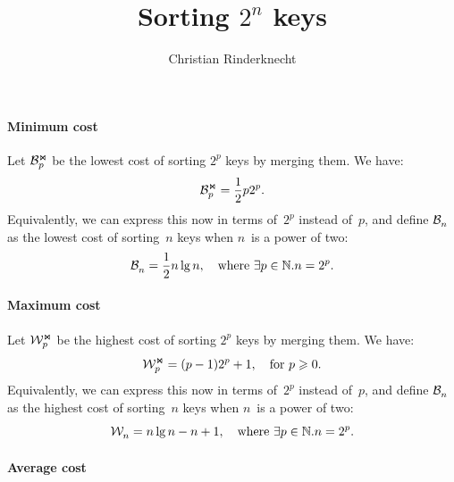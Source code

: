 \documentclass[a4paper,11pt,twoside,final]{book}
\title{Sorting $2^n$ keys}
\author{Christian Rinderknecht}
\theoremstyle{plain}
\begin{document}
\maketitle

\paragraph{Minimum cost}

Let \(\mathcal{B}_{p}^{\Join}\) be the lowest cost of sorting \(2^p\) keys by merging
them. We have:
\begin{equation*}
  \mathcal{B}_{p}^{\Join} = \frac{1}{2}p2^p.
\end{equation*}
Equivalently, we can express this now in terms of~\(2^p\) instead of~\(p\), and
define \(\mathcal{B}_{n}^{}\) as the lowest cost of sorting~\(n\) keys when \(n\)~is a
power of two:
\begin{equation}
  \mathcal{B}_{n}^{} = \frac{1}{2} n \lg n, \quad \text{where \(\exists p \in
    \mathbb{N}.n=2^p\).}
  \label{eq:best_power}
\end{equation}

\paragraph{Maximum cost}

Let \(\mathcal{W}_{p}^{\Join}\) be the highest cost of sorting \(2^p\) keys by merging
them. We have:
\begin{equation*}
\mathcal{W}_{p}^{\Join} = (p-1)2^p + 1, \quad \text{for \(p \geqslant 0\)}.
\end{equation*}
Equivalently, we can express this now in terms of~\(2^p\) instead of~\(p\), and
define \(\mathcal{B}_{n}^{}\) as the highest cost of sorting~\(n\) keys when \(n\)~is a
power of two:
\begin{equation}
  \mathcal{W}_{n}^{} = n \lg n - n + 1, \quad \text{where \(\exists p \in
    \mathbb{N}.n=2^p\).}
  \label{eq:worst_power}
\end{equation}

\paragraph{Average cost}
\label{par:Atms_2p}
\end{document}
